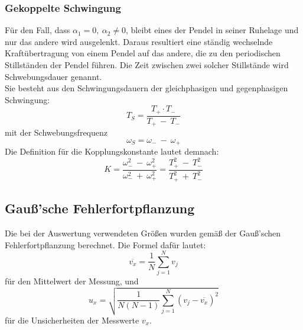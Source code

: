 \subsubsection{Gekoppelte Schwingung}
Für den Fall, dass $\alpha_1 = 0,\ \alpha_2 \neq 0$, bleibt eines der Pendel in seiner Ruhelage und nur das andere wird ausgelenkt.
Daraus resultiert eine ständig wechselnde Kraftübertragung von einem Pendel auf das andere, die zu den periodischen Stillständen der Pendel führen.
Die Zeit zwischen zwei solcher Stillstände wird Schwebungsdauer genannt.\\
Sie besteht aus den Schwingungsdauern der gleichphasigen und gegenphasigen Schwingung:
\begin{equation}
    T_S = \frac{T_+\cdot T_-}{T_+\ -\ T_-}
    \label{eq:Tpose}
\end{equation}
mit der Schwebungsfrequenz
\begin{equation}
    \omega_S = \omega_-\ -\ \omega_+
    \label{eq:lol3}
\end{equation}
Die Definition für die Kopplungskonstante lautet demnach:
\begin{equation}
    K = \frac{\omega_-^2\ -\ \omega_+^2}{\omega_-^2\ +\ \omega_+^2} = \frac{T_+^2\ -\ T_-^2}{T_+^2\ +\ T_-^2}
    \label{eq:Kform}
\end{equation}

\subsection{Gauß'sche Fehlerfortpflanzung}
\label{sec:gauß}
Die bei der Auswertung verwendeten Größen wurden gemäß der Gauß'schen Fehlerfortpflanzung berechnet.
Die Formel dafür lautet:
\begin{equation}
    \overline{v_x}=\frac{1}{N} \sum_{j=1}^N v_j
\end{equation}
für den Mittelwert der Messung, und
\begin{equation}
    u_x = \sqrt{\frac{1}{N(N-1)} \sum_{j=1}^N (v_j-\overline{v_x})^2}
\end{equation}
für die Unsicherheiten der Messwerte $v_x$.